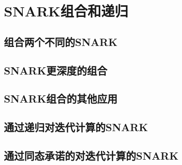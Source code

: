 \chapter{SNARK组合和递归}\label{chp:18Recursion}

\section{组合两个不同的SNARK}\label{18.1}
\section{SNARK更深度的组合}\label{18.2}
\section{SNARK组合的其他应用}\label{18.3}
\section{通过递归对迭代计算的SNARK}\label{18.4}
\section{通过同态承诺的对迭代计算的SNARK}\label{18.5}
